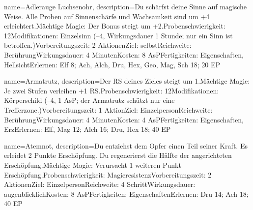 {
    name={Adlerauge Luchsenohr},
    description={Du schärfst deine Sinne auf magische Weise. Alle Proben auf Sinnenschärfe und Wachsamkeit sind um +4 erleichtert.\newline Mächtige Magie: Der Bonus steigt um +2.\newline Probenschwierigkeit: 12\newline Modifikationen: Einzelsinn (–4, Wirkungsdauer 1 Stunde; nur ein Sinn ist betroffen.)\newline Vorbereitungszeit: 2 Aktionen\newline Ziel: selbst\newline Reichweite: Berührung\newline Wirkungsdauer: 4 Minuten\newline Kosten: 8 AsP\newline Fertigkeiten: Eigenschaften, Hellsicht\newline Erlernen: Elf 8; Ach, Alch, Dru, Hex, Geo, Mag, Sch 18; 20 EP}
}


{
    name={Armatrutz},
    description={Der RS deines Zieles steigt um 1.\newline Mächtige Magie: Je zwei Stufen verleihen +1 RS.\newline Probenschwierigkeit: 12\newline Modifikationen: Körperschild (–4, 1 AsP; der Armatrutz schützt nur eine Trefferzone.)\newline Vorbereitungszeit: 1 Aktion\newline Ziel: Einzelperson\newline Reichweite: Berührung\newline Wirkungsdauer: 4 Minuten\newline Kosten: 4 AsP\newline Fertigkeiten: Eigenschaften, Erz\newline Erlernen: Elf, Mag 12; Alch 16; Dru, Hex 18; 40 EP}
}


{
    name={Atemnot},
    description={Du entziehst dem Opfer einen Teil seiner Kraft. Es erleidet 2 Punkte Erschöpfung. Du regenerierst die Hälfte der angerichteten Erschöpfung.\newline Mächtige Magie: Verursacht 1 weiteren Punkt Erschöpfung.\newline Probenschwierigkeit: Magieresistenz\newline Vorbereitungszeit: 2 Aktionen\newline Ziel: Einzelperson\newline Reichweite: 4 Schritt\newline Wirkungsdauer: augenblicklich\newline Kosten: 8 AsP\newline Fertigkeiten: Eigenschaften\newline Erlernen: Dru 14; Ach 18; 40 EP}
}


